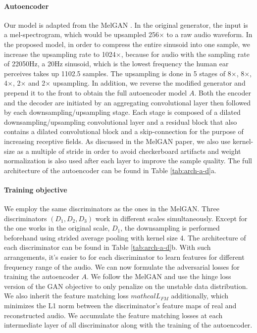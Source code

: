 \documentclass[12pt]{article}
\begin{document}
\paragraph{Autoencoder}
Our model is adapted from the MelGAN \cite{kun19}. In the original generator, the input is a mel-spectrogram, which would be upsampled 256$\times$ to a raw audio waveform. In the proposed model, in order to compress the entire sinusoid into one sample, we increase the upsampling rate to 1024$\times$, because for audio with the sampling rate of 22050Hz, a 20Hz sinusoid, which is the lowest frequency the human ear perceives takes up 1102.5 samples. The upsampling is done in 5 stages of 8$\times$, 8$\times$, 4$\times$, 2$\times$ and 2$\times$ upsampling. In addition, we reverse the modified generator and prepend it to the front to obtain the full autoencoder model $A$. Both the encoder and the decoder are initiated by an aggregating convolutional layer then followed by each downsampling/upsampling stage. Each stage is composed of a dilated downsampling/upsampling convolutional layer and a residual block that also contains a dilated convolutional block and a skip-connection for the purpose of increasing receptive fields. As discussed in the MelGAN paper, we also use kernel-size as a multiple of stride in order to avoid checkerboard artifacts \cite{ode16} and weight normalization \cite{lee16} is also used after each layer to improve the sample quality. The full architecture of the autoencoder can be found in Table \ref{tab:arch-a-d}a.

\paragraph{Training objective}
We employ the same discriminators as the ones in the MelGAN. Three discriminators $(D_1, D_2, D_3)$ work in different scales simultaneously. Except for the one works in the original scale, $D_1$, the downsampling is performed beforehand using strided average pooling with kernel size 4. The architecture of each discriminator can be found in Table \ref{tab:arch-a-d}b. With such arrangements, it's easier to for each discriminator to learn features for different frequency range of the audio. We can now formulate the adversarial losses for training the autoencoder $A$. We follow the MelGAN and use the hinge loss version of the GAN objective \cite{lim17} to only penalize on the unstable data distribution. We also inherit the feature matching loss $mathcal{L}_{FM}$ additionally, which minimizes the L1 norm between the discriminator's feature maps of real and reconstructed audio. We accumulate the feature matching losses at each intermediate layer of all discriminator along with the training of the autoencoder.
\end{document}
